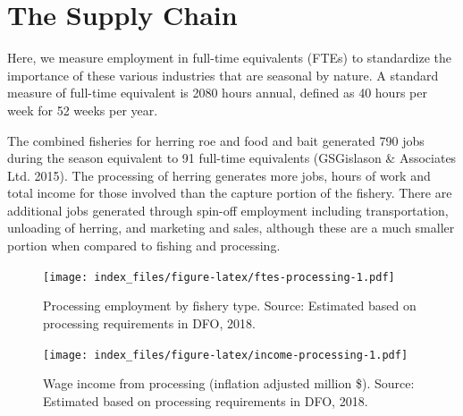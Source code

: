 \documentclass[]{article}
\theoremstyle{definition}
\theoremstyle{definition}
\theoremstyle{definition}
\theoremstyle{remark}
\begin{document}
\section{The Supply Chain}\label{the-supply-chain}

Here, we measure employment in full-time equivalents (FTEs) to
standardize the importance of these various industries that are seasonal
by nature. A standard measure of full-time equivalent is 2080 hours
annual, defined as 40 hours per week for 52 weeks per year.

The combined fisheries for herring roe and food and bait generated 790
jobs during the season equivalent to 91 full-time equivalents
(GSGislason \& Associates Ltd. 2015). The processing of herring
generates more jobs, hours of work and total income for those involved
than the capture portion of the fishery. There are additional jobs
generated through spin-off employment including transportation,
unloading of herring, and marketing and sales, although these are a much
smaller portion when compared to fishing and processing.

\begin{figure}
\centering
\texttt{[image: index\_files/figure-latex/ftes-processing-1.pdf]}
\caption{\label{fig:ftes-processing}Processing employment by fishery type.
Source: Estimated based on processing requirements in DFO, 2018.}
\end{figure}

\begin{figure}
\centering
\texttt{[image: index\_files/figure-latex/income-processing-1.pdf]}
\caption{\label{fig:income-processing}Wage income from processing (inflation
adjusted million \$). Source: Estimated based on processing requirements
in DFO, 2018.}
\end{figure}
\end{document}
